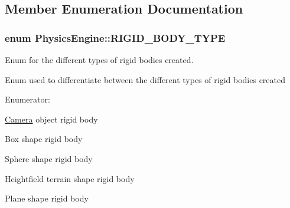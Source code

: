 \subsection{Member Enumeration Documentation}
\hypertarget{class_physics_engine_f9cf664e8df4f9a518448aa122957077}{
\subsubsection[RIGID\_\-BODY\_\-TYPE]{\setlength{\rightskip}{0pt plus 5cm}enum {\bf PhysicsEngine::RIGID\_\-BODY\_\-TYPE}}}
\label{class_physics_engine_f9cf664e8df4f9a518448aa122957077}


Enum for the different types of rigid bodies created. 

Enum used to differentiate between the different types of rigid bodies created \begin{Desc}
\item[Enumerator: ]\par
\begin{description}
\item[{\em 
\hypertarget{class_physics_engine_f9cf664e8df4f9a518448aa1229570775b12039b51b36d92231a67695ea07e28}{
CAMERA}
\label{class_physics_engine_f9cf664e8df4f9a518448aa1229570775b12039b51b36d92231a67695ea07e28}
}]\hyperlink{class_camera}{Camera} object rigid body \item[{\em 
\hypertarget{class_physics_engine_f9cf664e8df4f9a518448aa122957077219567afcdbe1eb7fe073c81b43dd5c0}{
BOX}
\label{class_physics_engine_f9cf664e8df4f9a518448aa122957077219567afcdbe1eb7fe073c81b43dd5c0}
}]Box shape rigid body \item[{\em 
\hypertarget{class_physics_engine_f9cf664e8df4f9a518448aa122957077d3a5fc2a81d07760aa5d18bb1b79cd9b}{
SPHERE}
\label{class_physics_engine_f9cf664e8df4f9a518448aa122957077d3a5fc2a81d07760aa5d18bb1b79cd9b}
}]Sphere shape rigid body \item[{\em 
\hypertarget{class_physics_engine_f9cf664e8df4f9a518448aa122957077504250562f6fb421a154714f65c870ad}{
HEIGHTFIELD}
\label{class_physics_engine_f9cf664e8df4f9a518448aa122957077504250562f6fb421a154714f65c870ad}
}]Heightfield terrain shape rigid body \item[{\em 
\hypertarget{class_physics_engine_f9cf664e8df4f9a518448aa122957077c9cfd25eead0581ed6bd4050b3cfbe13}{
PLANE}
\label{class_physics_engine_f9cf664e8df4f9a518448aa122957077c9cfd25eead0581ed6bd4050b3cfbe13}
}]Plane shape rigid body \end{description}
\end{Desc}



